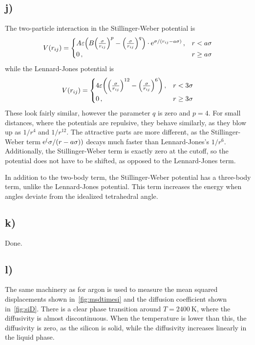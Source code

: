 \documentclass[11pt,british,a4paper]{report}
\let\oldexp=\exp
\renewcommand{\exp}[1]{\mathrm{e}^{#1}}
\begin{document}
\subsection*{j)}
The two-particle interaction in the Stillinger-Weber potential is
\[
    V(r_{ij}) = \begin{cases}A\varepsilon\qty(B\qty(\frac{\sigma}{r_{ij}})^p - \qty(\frac{\sigma}{r_{ij}})^q)\cdot\exp{\sigma/\qty(r_{ij}-a\sigma)}\,, & r < a\sigma\\ 0\,, & r\geq a\sigma \end{cases}
\]
while the Lennard-Jones potential is
\[
    V(r_{ij}) = \begin{cases}4\varepsilon \qty({\qty(\frac{\sigma}{r_{ij}})}^{12} - {\qty(\frac{\sigma}{r_{ij}})}^6)\,, & r < 3\sigma\\ 0\,, & r\geq3\sigma\end{cases}
\]
These look fairly similar, however the parameter \(q\) is zero\cite{stillinger_computer_1985} and \(p=4\). For small distances, where the potentials are repulsive, they behave similarly, as they blow up as \(1/r^4\) and \(1/r^{12}\). The attractive parts are more different, as the Stillinger-Weber term \(\oldexp(\sigma/\qty(r-a\sigma))\) decays much faster than Lennard-Jones's \(1/r^6\). Additionally, the Stillinger-Weber term is exactly zero at the cutoff, so the potential does not have to be shifted, as opposed to the Lennard-Jones term.

In addition to the two-body term, the Stillinger-Weber potential has a three-body term, unlike the Lennard-Jones potential. This term increases the energy when angles deviate from the idealized tetrahedral angle.

\subsection*{k)}
Done.

\subsection*{l)}
The same machinery as for argon is used to measure the mean squared displacements shown in~\vref{fig:msdtimesi} and the diffusion coefficient shown in~\vref{fig:siD}. There is a clear phase transition around \(T=\SI{2400}{\kelvin}\), where the diffusivity is almost discontinuous. When the temperature is lower than this, the diffusivity is zero, as the silicon is solid, while the diffusivity increases linearly in the liquid phase.
\end{document}
